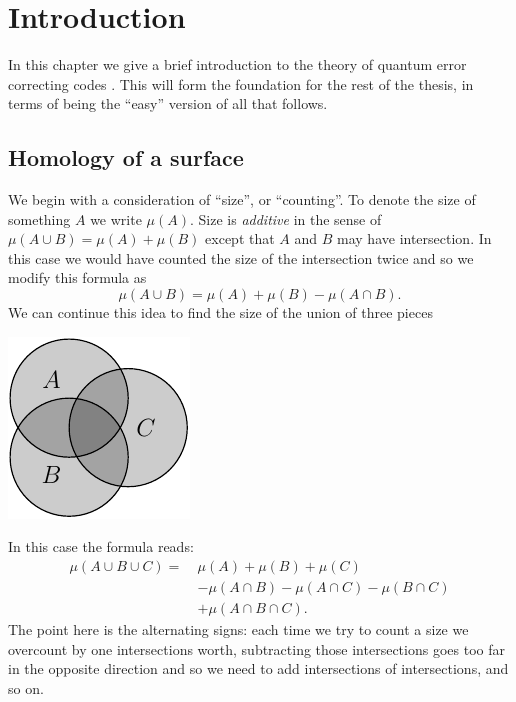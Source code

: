 \documentclass[11pt,oneside]{report}
\def\euler{\mu}
\begin{document}
\chapter{Introduction}

%


In this chapter we give a brief introduction to
the theory of quantum error correcting codes \cite{Calderbank1997,Dennis2002}.
This will form the foundation for the rest of the thesis,
in terms of being the ``easy'' version of all that follows.

\section{Homology of a surface}

We begin with a consideration of ``size'', or ``counting''.
To denote the size of something $A$ we write $\euler(A).$
Size is \emph{additive} in the sense of 
$\euler(A\cup B) = \euler(A) + \euler(B)$ except that
$A$ and $B$ may have intersection.
In this case we would have counted the 
size of the intersection twice and so we modify this formula as
$$
    \euler(A\cup B) = \euler(A) + \euler(B) - \euler(A\cap B).
$$
We can continue this idea to find the
size of the union of three pieces
\begin{center}
\includegraphics{pic-ABC.pdf}
\end{center}
In this case the formula reads:
\begin{align}\label{EulerAddSub}
\euler(A\cup B\cup C) = \ &\euler(A) + \euler(B) + \euler(C)  \nonumber \\
                     &- \euler(A\cap B) - \euler(A\cap C) - \euler(B\cap C) \nonumber \\
                     &+ \euler(A\cap B \cap C).
\end{align}
The point here is the alternating signs:
each time we try to count a size we overcount by
one intersections worth, subtracting those intersections
goes too far in the opposite direction and so we need
to add intersections of intersections, and so on.
\end{document}
